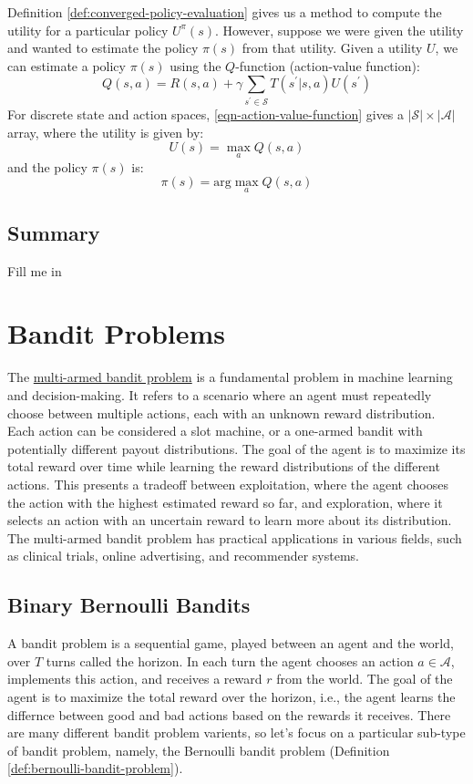 \documentclass[11pt]{article}
\theoremstyle{definition}
\begin{document}
Definition \ref{def:converged-policy-evaluation} gives us a method to compute the utility for a particular policy $U^{\pi}(s)$. 
However, suppose we were given the utility and wanted to estimate the policy $\pi(s)$ from that utility. 
Given a utility $U$, we can estimate a policy $\pi(s)$ using the $Q$-function (action-value function):
\begin{equation}\label{eqn-action-value-function}
Q(s,a) = R(s,a) + \gamma\sum_{s^{\prime}\in\mathcal{S}}T(s^{\prime} | s, a)U(s^{\prime})
\end{equation}
For discrete state and action spaces, \eqref{eqn-action-value-function} gives a $|\mathcal{S}|\times|\mathcal{A}|$ array, where the utility is given by:
\begin{equation}\label{eqn-utility-from-Q}
U(s) = \max_{a} Q(s,a)
\end{equation}
and the policy $\pi(s)$ is:
\begin{equation}\label{eqn-policy-from-Q}
\pi(s) = \text{arg}\max_{a}Q(s,a)
\end{equation}

\subsection{Summary}
Fill me in

\section{Bandit Problems}
The \href{https://en.wikipedia.org/wiki/Multi-armed_bandit}{multi-armed bandit problem} is a fundamental problem in machine learning and decision-making. 
It refers to a scenario where an agent must repeatedly choose between multiple actions, each with an unknown reward distribution. 
Each action can be considered a slot machine, or a one-armed bandit with potentially different payout distributions. 
The goal of the agent is to maximize its total reward over time while learning the reward distributions of the different actions. 
This presents a tradeoff between exploitation, where the agent chooses the action with the highest estimated reward so far, and exploration, 
where it selects an action with an uncertain reward to learn more about its distribution. The multi-armed bandit problem has practical applications in various fields, 
such as clinical trials, online advertising, and recommender systems.

\subsection{Binary Bernoulli Bandits}\label{sec:binary-bernoulli-bandits}
A bandit problem is a sequential game, played between an agent and the world, over $T$ turns called the horizon.
In each turn the agent chooses an action $a\in\mathcal{A}$, implements this action, and receives a reward $r$ from the world.
The goal of the agent is to maximize the total reward over the horizon, i.e., the agent learns the differnce between good and bad actions based on the rewards it receives.
There are many different bandit problem varients, so let's focus on a particular sub-type of bandit problem, namely, 
the Bernoulli bandit problem (Definition \ref{def:bernoulli-bandit-problem}).
\end{document}
